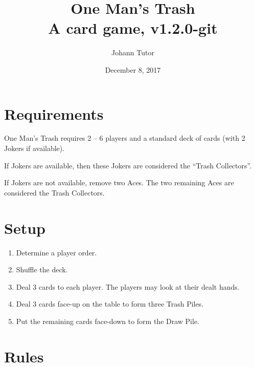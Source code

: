 \documentclass{article}
\newcommand\theversion{1.2.0-git}
\newcommand\thegame{One Man's Trash}
\begin{document}
\title{\thegame{}\\ \large A card game, v\theversion}
\author{Johann Tutor}
\date{December 8, 2017}
\maketitle


\tableofcontents

\newpage

\section{Requirements \label{sec:requirements}}

\thegame{} requires 2 -- 6 players and a standard deck of cards (with 2 Jokers if available).

If Jokers are available, then these Jokers are considered the ``Trash Collectors''.

If Jokers are not available, remove two Aces.
The two remaining Aces are considered the Trash Collectors.

\section{Setup \label{sec:setup}}

\begin{enumerate}
  \item Determine a player order.
  \item Shuffle the deck.
  \item Deal 3 cards to each player. The players may look at their dealt hands.
  \item Deal 3 cards face-up on the table to form three Trash Piles.
  \item Put the remaining cards face-down to form the Draw Pile.
\end{enumerate}

\section{Rules \label{sec:rules}}
\end{document}

